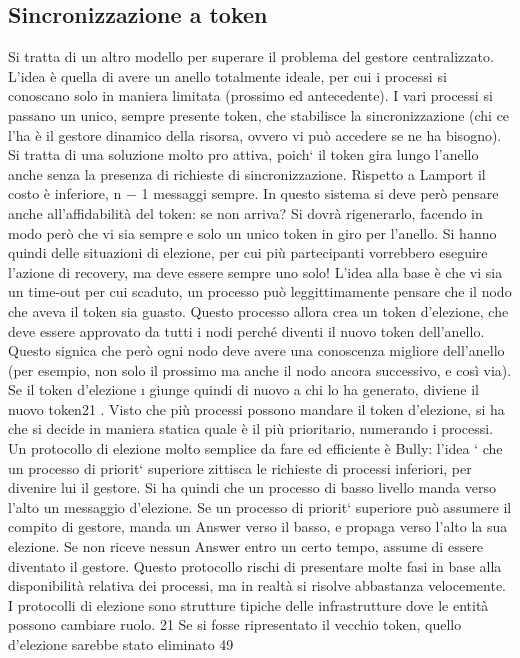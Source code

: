 \subsection{Sincronizzazione a token}
Si tratta di un altro modello per superare il problema del gestore centralizzato. L'idea è quella di avere un anello
totalmente ideale, per cui i processi si
conoscano solo in maniera limitata (prossimo ed antecedente). I vari processi
si passano un unico, sempre presente token, che stabilisce la sincronizzazione
(chi ce l'ha è il gestore dinamico della risorsa, ovvero vi può accedere se ne
ha bisogno). Si tratta di una soluzione molto pro attiva, poich` il token gira
lungo l'anello anche senza la presenza di richieste di sincronizzazione. Rispetto
a Lamport il costo è inferiore, n $-$ 1 messaggi sempre.
In questo sistema si deve però pensare anche all'affidabilità del token: se
non arriva? Si dovrà rigenerarlo, facendo in modo però che vi sia sempre e solo
un unico token in giro per l'anello. Si hanno quindi delle situazioni di elezione,
per cui più partecipanti vorrebbero eseguire l'azione di recovery, ma deve essere
sempre uno solo! L'idea alla base è che vi sia un time-out per cui scaduto, un
processo può leggittimamente pensare che il nodo che aveva il token sia guasto.
Questo processo allora crea un token d'elezione, che deve essere approvato da
tutti i nodi perché diventi il nuovo token dell'anello. Questo signica che però
ogni nodo deve avere una conoscenza migliore dell'anello (per esempio, non solo
il prossimo ma anche il nodo ancora successivo, e così via). Se il token d'elezione
\i{}
giunge quindi di nuovo a chi lo ha generato, diviene il nuovo token21 . Visto che
più processi possono mandare il token d'elezione, si ha che si decide in maniera
statica quale è il più prioritario, numerando i processi.
Un protocollo di elezione molto semplice da fare ed efficiente è Bully: l'idea
` che un processo di priorit` superiore zittisca le richieste di processi inferiori,
per divenire lui il gestore. Si ha quindi che un processo di basso livello manda
verso l'alto un messaggio d'elezione. Se un processo di priorit` superiore può
assumere il compito di gestore, manda un Answer verso il basso, e propaga verso
l'alto la sua elezione. Se non riceve nessun Answer entro un certo tempo, assume
di essere diventato il gestore. Questo protocollo rischi di presentare molte fasi
in base alla disponibilità relativa dei processi, ma in realtà si risolve abbastanza
velocemente. I protocolli di elezione sono strutture tipiche delle infrastrutture
dove le entità possono cambiare ruolo.
21 Se
si fosse ripresentato il vecchio token, quello d'elezione sarebbe stato eliminato
49
